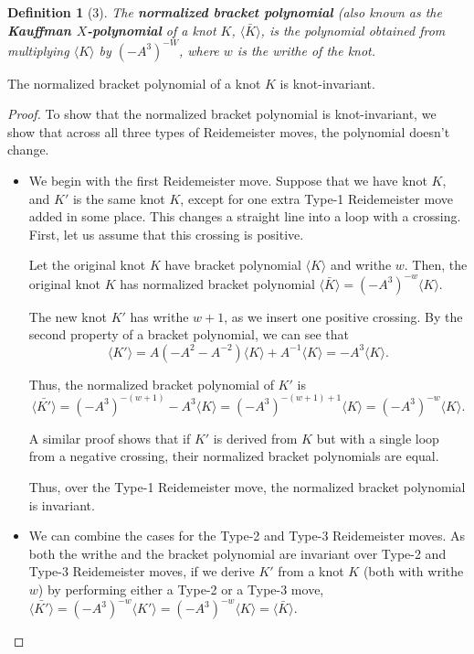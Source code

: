 \documentclass[12pt]{article}
\newtheorem{definition}{Definition}[section]
\newenvironment{theorem}[2][Theorem]{\begin{trivlist}
\item[\hskip \labelsep {\bfseries #1}\hskip \labelsep {\bfseries #2.}]}{\end{trivlist}}
\begin{document}
\begin{definition} [3]
The \textbf{normalized bracket polynomial} (also known as the \textbf{Kauffman $X$-polynomial} of a knot $K$, $\langle \bar{K} \rangle$, is the polynomial obtained from multiplying $\langle K \rangle$ by $(-A^3)^{-W}$, where $w$ is the writhe of the knot. 
\end{definition}
\begin{theorem}{3.1}
The normalized bracket polynomial of a knot $K$ is knot-invariant. 
\end{theorem}
\begin{proof}

To show that the normalized bracket polynomial is knot-invariant, we show that across all three types of Reidemeister moves, the polynomial doesn't change. 

\begin{itemize}

\item We begin with the first Reidemeister move. Suppose that we have knot $K$, and $K'$ is the same knot $K$, except for one extra Type-1 Reidemeister move added in some place. This changes a straight line into a loop with a crossing. First, let us assume that this crossing is positive. 

Let the original knot $K$ have bracket polynomial $\langle K \rangle$ and writhe $w$. Then, the original knot $K$ has normalized bracket polynomial $\langle \bar{K} \rangle = (-A^3)^{-w} \langle K \rangle$. 

The new knot $K'$ has writhe $w + 1$, as we insert one positive crossing.  By the second property of a bracket polynomial, we can see that $$\langle K' \rangle = A (-A^2 - A^{-2}) \langle K \rangle + A^{-1} \langle K \rangle = -A^{3} \langle K \rangle.$$

Thus, the normalized bracket polynomial of $K'$ is $$\langle \bar{K'} \rangle = (-A^3)^{-(w + 1)} -A^3 \langle K \rangle = (-A^3)^{-(w + 1) + 1} \langle K \rangle = (-A^3)^{-w} \langle K \rangle.$$

A similar proof shows that if $K'$ is derived from $K$ but with a single loop from a negative crossing, their normalized bracket polynomials are equal. 

Thus, over the Type-1 Reidemeister move, the normalized bracket polynomial is invariant. 

\item We can combine the cases for the Type-2 and Type-3 Reidemeister moves. As both the writhe and the bracket polynomial are invariant over Type-2 and Type-3 Reidemeister moves, if we derive $K'$ from a knot $K$ (both with writhe $w$) by performing either a Type-2 or a Type-3 move, $\langle \bar{K'} \rangle = (-A^3)^{-w} \langle K' \rangle = (-A^3)^{-w} \langle K \rangle = \langle \bar{K} \rangle.$


\end{itemize}
\end{proof}
\end{document}
